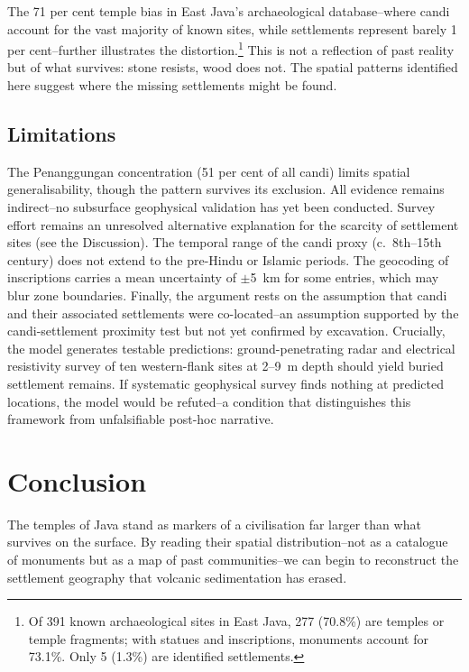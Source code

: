 \documentclass[12pt,a4paper]{article}
\begin{document}
The 71 per cent temple bias in East Java's archaeological database--where candi account for the vast majority of known sites, while settlements represent barely 1 per cent--further illustrates the distortion.\footnote{Of 391 known archaeological sites in East Java, 277 (70.8\%) are temples or temple fragments; with statues and inscriptions, monuments account for 73.1\%. Only 5 (1.3\%) are identified settlements.}
This is not a reflection of past reality but of what survives: stone resists, wood does not.
The spatial patterns identified here suggest where the missing settlements might be found.

\subsection{Limitations}

The Penanggungan concentration (51 per cent of all candi) limits spatial generalisability, though the pattern survives its exclusion.
All evidence remains indirect--no subsurface geophysical validation has yet been conducted.
Survey effort remains an unresolved alternative explanation for the scarcity of settlement sites (see the Discussion).
The temporal range of the candi proxy (c.~8th--15th century) does not extend to the pre-Hindu or Islamic periods.
The geocoding of inscriptions carries a mean uncertainty of $\pm$5~km for some entries, which may blur zone boundaries.
Finally, the argument rests on the assumption that candi and their associated settlements were co-located--an assumption supported by the candi-settlement proximity test but not yet confirmed by excavation.
Crucially, the model generates testable predictions: ground-penetrating radar and electrical resistivity survey of ten western-flank sites at 2--9~m depth should yield buried settlement remains.
If systematic geophysical survey finds nothing at predicted locations, the model would be refuted--a condition that distinguishes this framework from unfalsifiable post-hoc narrative.


\section{Conclusion}

The temples of Java stand as markers of a civilisation far larger than what survives on the surface.
By reading their spatial distribution--not as a catalogue of monuments but as a map of past communities--we can begin to reconstruct the settlement geography that volcanic sedimentation has erased.
\end{document}
